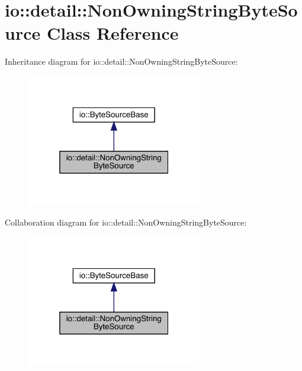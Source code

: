 \hypertarget{classio_1_1detail_1_1_non_owning_string_byte_source}{}\section{io\+:\+:detail\+:\+:Non\+Owning\+String\+Byte\+Source Class Reference}
\label{classio_1_1detail_1_1_non_owning_string_byte_source}


Inheritance diagram for io\+:\+:detail\+:\+:Non\+Owning\+String\+Byte\+Source\+:
\nopagebreak
\begin{figure}[H]
\begin{center}
\leavevmode
\includegraphics[width=217pt]{classio_1_1detail_1_1_non_owning_string_byte_source__inherit__graph}
\end{center}
\end{figure}


Collaboration diagram for io\+:\+:detail\+:\+:Non\+Owning\+String\+Byte\+Source\+:
\nopagebreak
\begin{figure}[H]
\begin{center}
\leavevmode
\includegraphics[width=217pt]{classio_1_1detail_1_1_non_owning_string_byte_source__coll__graph}
\end{center}
\end{figure}
